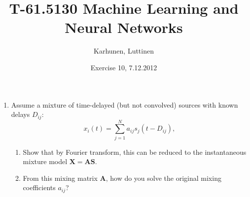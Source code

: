 
\title{T-61.5130 Machine Learning and Neural Networks}
\author{Karhunen, Luttinen}
\date{Exercise 10, 7.12.2012}

\usepackage{cancel}

\newcommand{\vect}[1]{{\bf{#1}}}
\newcommand{\svect}[1]{\boldsymbol{#1}}
\newcommand{\matr}[1]{\boldsymbol{#1}}




\maketitle

\begin{enumerate}


\item Assume a mixture of time-delayed (but not convolved) sources with known delays $D_{ij}$:
  \begin{displaymath}
    x_i(t) = \sum_{j=1}^N a_{ij}s_j(t-D_{ij}),
  \end{displaymath}
  \begin{enumerate}
  \item Show that by Fourier transform, this can be reduced to the instantaneous mixture
    model $\mathbf{X} = \mathbf{A} \mathbf{S}$.
  \item From this mixing matrix $\mathbf{A}$, how do you solve the original mixing
    coefficients $a_{ij}$?
  \end{enumerate}

  \begin{solution}



\end{solution}
\end{enumerate}

